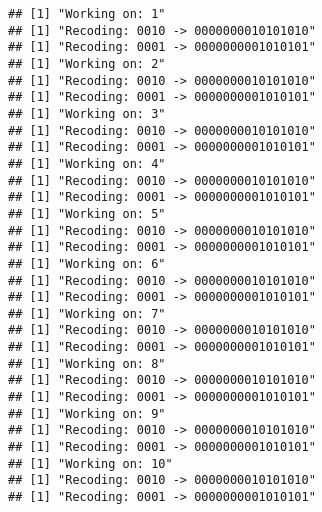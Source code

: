 \documentclass[
]{article}
\newenvironment{Shaded}{\begin{snugshade}}{\end{snugshade}}
\newcommand{\AttributeTok}[1]{\textcolor[rgb]{0.13,0.29,0.53}{#1}}
\newcommand{\CommentTok}[1]{\textcolor[rgb]{0.56,0.35,0.01}{\textit{#1}}}
\newcommand{\ConstantTok}[1]{\textcolor[rgb]{0.56,0.35,0.01}{#1}}
\newcommand{\DecValTok}[1]{\textcolor[rgb]{0.00,0.00,0.81}{#1}}
\newcommand{\FunctionTok}[1]{\textcolor[rgb]{0.13,0.29,0.53}{\textbf{#1}}}
\newcommand{\NormalTok}[1]{#1}
\newcommand{\OtherTok}[1]{\textcolor[rgb]{0.56,0.35,0.01}{#1}}
\newcommand{\SpecialCharTok}[1]{\textcolor[rgb]{0.81,0.36,0.00}{\textbf{#1}}}
\newcommand{\StringTok}[1]{\textcolor[rgb]{0.31,0.60,0.02}{#1}}
\begin{document}
\begin{Shaded}
\end{Shaded}

\begin{verbatim}
## [1] "Working on: 1"
## [1] "Recoding: 0010 -> 0000000010101010"
## [1] "Recoding: 0001 -> 0000000001010101"
## [1] "Working on: 2"
## [1] "Recoding: 0010 -> 0000000010101010"
## [1] "Recoding: 0001 -> 0000000001010101"
## [1] "Working on: 3"
## [1] "Recoding: 0010 -> 0000000010101010"
## [1] "Recoding: 0001 -> 0000000001010101"
## [1] "Working on: 4"
## [1] "Recoding: 0010 -> 0000000010101010"
## [1] "Recoding: 0001 -> 0000000001010101"
## [1] "Working on: 5"
## [1] "Recoding: 0010 -> 0000000010101010"
## [1] "Recoding: 0001 -> 0000000001010101"
## [1] "Working on: 6"
## [1] "Recoding: 0010 -> 0000000010101010"
## [1] "Recoding: 0001 -> 0000000001010101"
## [1] "Working on: 7"
## [1] "Recoding: 0010 -> 0000000010101010"
## [1] "Recoding: 0001 -> 0000000001010101"
## [1] "Working on: 8"
## [1] "Recoding: 0010 -> 0000000010101010"
## [1] "Recoding: 0001 -> 0000000001010101"
## [1] "Working on: 9"
## [1] "Recoding: 0010 -> 0000000010101010"
## [1] "Recoding: 0001 -> 0000000001010101"
## [1] "Working on: 10"
## [1] "Recoding: 0010 -> 0000000010101010"
## [1] "Recoding: 0001 -> 0000000001010101"
\end{verbatim}
\end{document}
